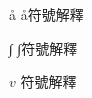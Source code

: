 
\begin{denotation}[3cm]

  \item[å]{
              å符號解釋
        }

  \item[∫]{
              ∫符號解釋
        }

  \item[$v$]{
              符號解釋
        }

\end{denotation}

